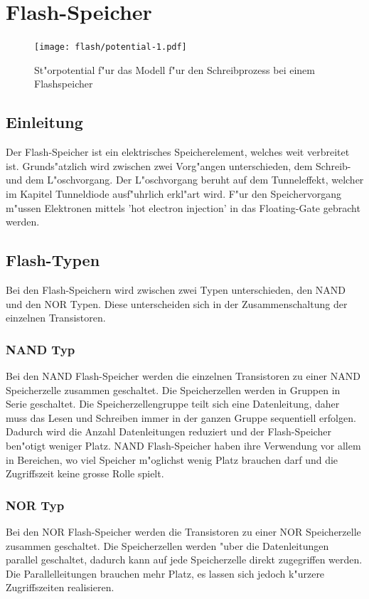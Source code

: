 \chapter{Flash-Speicher\label{chapter:flash}}
\begin{refsection}

\begin{figure}
\centering
\texttt{[image: flash/potential-1.pdf]}
\caption{St"orpotential f"ur das Modell f"ur den Schreibprozess bei
einem Flashspeicher}
\end{figure}

\section{Einleitung}
Der Flash-Speicher ist ein elektrisches Speicherelement, welches
weit verbreitet ist. Grunds"atzlich wird zwischen zwei Vorg"angen
unterschieden, dem Schreib- und dem L"oschvorgang. Der L"oschvorgang
beruht auf dem Tunneleffekt, welcher im Kapitel Tunneldiode ausf"uhrlich
erkl"art wird. F"ur den Speichervorgang m"ussen Elektronen mittels
'hot electron injection' in das Floating-Gate gebracht werden.

\section{Flash-Typen}
Bei den Flash-Speichern wird zwischen zwei Typen unterschieden, den NAND
und den NOR Typen. Diese unterscheiden sich in der Zusammenschaltung
der einzelnen Transistoren.

\subsection{NAND Typ}
Bei den NAND Flash-Speicher werden die einzelnen Transistoren zu einer
NAND Speicherzelle zusammen geschaltet. Die Speicherzellen werden in
Gruppen in Serie geschaltet. Die Speicherzellengruppe teilt sich eine
Datenleitung, daher muss das Lesen und Schreiben immer in der ganzen
Gruppe sequentiell erfolgen. Dadurch wird die Anzahl Datenleitungen
reduziert und der Flash-Speicher ben"otigt weniger Platz. NAND
Flash-Speicher haben ihre Verwendung vor allem in Bereichen, wo viel
Speicher m"oglichst wenig Platz brauchen darf und die Zugriffszeit keine
grosse Rolle spielt.
\subsection{NOR Typ}
Bei den NOR Flash-Speicher werden die Transistoren zu einer NOR
Speicherzelle zusammen geschaltet.
Die Speicherzellen werden "uber die Datenleitungen parallel geschaltet,
dadurch kann auf jede Speicherzelle direkt zugegriffen werden. Die
Parallelleitungen brauchen mehr Platz, es lassen sich jedoch k"urzere
Zugriffszeiten realisieren.


\end{refsection}
